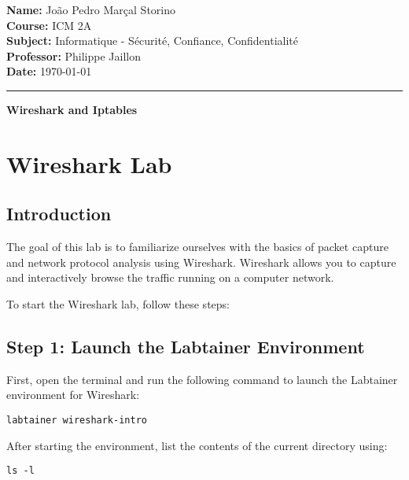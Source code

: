 \documentclass[a4paper,12pt]{article} %
\begin{document}
\begin{flushleft}
\textbf{Name:} João Pedro Marçal Storino \\
\textbf{Course:} ICM 2A \\
\textbf{Subject:} Informatique - Sécurité, Confiance, Confidentialité \\
\textbf{Professor:} Philippe Jaillon \\
\textbf{Date:} \today
\end{flushleft}

\noindent\rule{\textwidth}{0.4mm} %

\vspace{0.5cm} %
\begin{center}
    {\LARGE \textbf{Wireshark and Iptables}} %
\end{center}

\vspace{0.5cm} %

\section*{Wireshark Lab}

\subsection*{Introduction}
The goal of this lab is to familiarize ourselves with the basics of packet capture and network protocol analysis using Wireshark. Wireshark allows you to capture and interactively browse the traffic running on a computer network.

To start the Wireshark lab, follow these steps:

\subsection*{Step 1: Launch the Labtainer Environment}
First, open the terminal and run the following command to launch the Labtainer environment for Wireshark:

\begin{verbatim}
labtainer wireshark-intro
\end{verbatim}

After starting the environment, list the contents of the current directory using:

\begin{verbatim}
ls -l
\end{verbatim}
\end{document}
